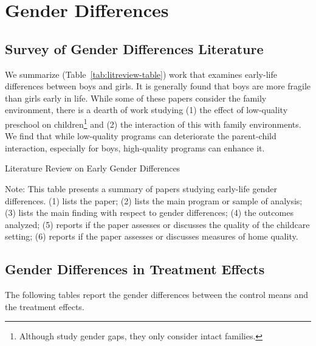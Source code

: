 \section{Gender Differences}
\label{appendix:genderdifferences}

\subsection{Survey of Gender Differences Literature}
\label{appendix:gdiff-survey}

We summarize (Table~\ref{tab:litreview-table}) work that examines early-life differences between boys and girls. It is generally found that boys are more fragile than girls early in life. While some of these papers consider the family environment, there is a dearth of work studying (1) the effect of low-quality preschool on children\footnote{Although \citet{Kottelenberg_Lehrer_2014_Gender-Effects} study gender gaps, they only consider intact families.} and (2) the interaction of this with family environments. We find that while low-quality programs can deteriorate the parent-child interaction, especially for boys, high-quality programs can enhance it.

\begin{table}
\centering
\caption{Literature Review on Early Gender Differences}
\label{tab:litreview-table}
\begin{adjustbox}{width=1.05\textwidth}
\begin{threeparttable}

\begin{tablenotes}
\Large
\item Note: This table presents a summary of papers studying early-life gender differences. (1) lists the paper; (2) lists the main program or sample of analysis; (3) lists the main finding with respect to gender differences; (4) the outcomes analyzed; (5) reports if the paper assesses or discusses the quality of the childcare setting; (6) reports if the paper assesses or discusses measures of home quality.
\end{tablenotes}
\end{threeparttable}
\end{adjustbox}
\end{table} 

\subsection{Gender Differences in Treatment Effects}
\label{appendix:gdiff-tes}
The following tables report the gender differences between the control means and the treatment effects.

